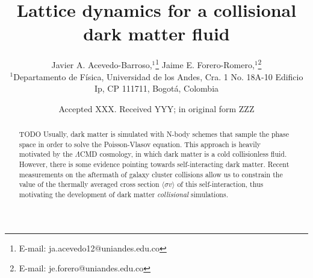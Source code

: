 \documentclass[fleqn,usenatbib]{mnras}
\title[Collisional lattice dynamics]{Lattice dynamics for a collisional dark matter fluid}
\author[J. A. Acevedo-Barroso \& J. E. Forero-Romero]{
Javier A. Acevedo-Barroso,$^{1}$\thanks{E-mail: ja.acevedo12@uniandes.edu.co}
Jaime E. Forero-Romero,$^{1}$\thanks{E-mail: je.forero@uniandes.edu.co}
\\
$^{1}$Departamento de F\'isica, Universidad de los Andes, Cra. 1 No. 18A-10 Edificio Ip, CP 111711, Bogot\'a, Colombia\\
}
\date{Accepted XXX. Received YYY; in original form ZZZ}
\newcommand{\crosssection}{\langle \sigma v \rangle}
\begin{document}
\label{firstpage}
\pagerange{\pageref{firstpage}--\pageref{lastpage}}
\maketitle

\begin{abstract}




TODO
Usually, dark matter is simulated with N-body schemes that sample the phase space in order to solve the Poisson-Vlasov equation. This approach is heavily motivated by the $\Lambda$CMD cosmology, in which dark matter is a cold collisionless fluid.
However, there is some evidence pointing towards self-interacting dark matter. Recent measurements on the aftermath of galaxy cluster collisions allow us to constrain the value of the thermally averaged cross section $\crosssection$ of this self-interaction, thus motivating the development of dark matter \emph{collisional} simulations.


\end{abstract}
\end{document}
